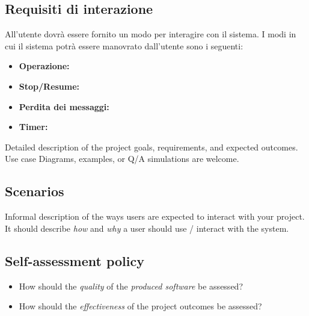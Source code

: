 	\subsection{Requisiti di interazione}
	All'utente dovrà essere fornito un modo per interagire con il sistema. I modi in cui il sistema potrà essere manovrato dall'utente sono i seguenti:
		\begin{itemize}
			\item \textbf{Operazione:}
			\item \textbf{Stop/Resume:}
			\item \textbf{Perdita dei messaggi:}
			\item \textbf{Timer:}

		\end{itemize}


	

	Detailed description of the project goals, requirements, and expected outcomes.
	Use case Diagrams, examples, or Q/A simulations are welcome.

	\subsection{Scenarios}

	Informal description of the ways users are expected to interact with your project.
	It should describe \emph{how} and \emph{why} a user should use / interact with the system.

	\subsection{Self-assessment policy}

	\begin{itemize}
	    \item How should the \emph{quality} of the \emph{produced software} be assessed?
	    
	    \item How should the \emph{effectiveness} of the project outcomes be assessed?
	\end{itemize}